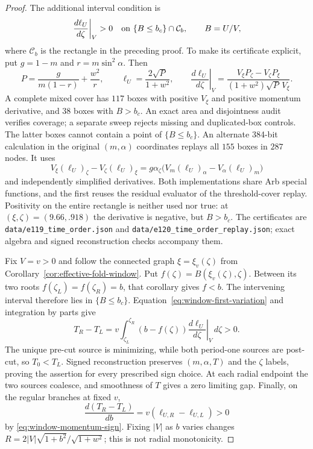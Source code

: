 \documentclass[11pt,a4paper]{article}
\theoremstyle{remark}\newtheorem{remark}[theorem]{Remark}
\begin{document}
\begin{proof}
The additional interval condition is
\begin{equation}\label{eq:window-momentum-sign}
 \left.\frac{d\ell_U}{d\zeta}\right|_V>0
 \quad\hbox{on }\{B\le b_c\}\cap\mathcal C_b,
 \qquad B=U/V,
\end{equation}
where $\mathcal C_b$ is the rectangle in the preceding proof. To make
its certificate explicit, put $g=1-m$ and $r=m\sin^2\alpha$. Then
\[
 P=\frac{g}{m(1-r)}+\frac{w^2}{r},\qquad
 \ell_U=\frac{2\sqrt P}{1+w^2},\qquad
 \left.\frac{d\ell_U}{d\zeta}\right|_V
 =\frac{V_\xi P_\zeta-V_\zeta P_\xi}
 {(1+w^2)\sqrt P\,V_\xi}.
\]
A complete mixed cover has $117$ boxes with positive $V_\xi$ and
positive momentum derivative, and $38$ boxes with $B>b_c$.
An exact area and disjointness audit verifies coverage; a separate
sweep rejects missing and duplicated-box controls. The latter boxes
cannot contain a point of $\{B\le b_c\}$.
An alternate 384-bit calculation in the original $(m,\alpha)$ coordinates
replays all $155$ boxes in $287$ nodes. It uses
\[
 V_\xi(\ell_U)_\zeta-V_\zeta(\ell_U)_\xi
 =g\alpha_\zeta\bigl(V_m(\ell_U)_\alpha-V_\alpha(\ell_U)_m\bigr)
\]
and independently simplified derivatives.  Both implementations share
Arb special functions, and the first reuses the residual evaluator of
the threshold-cover replay. Positivity on the entire rectangle is neither
used nor true: at $(\xi,\zeta)=(9.66,.918)$ the derivative is negative,
but $B>b_c$. The certificates are
\nolinkurl{data/e119_time_order.json} and
\nolinkurl{data/e120_time_order_replay.json}; exact algebra and signed
reconstruction checks accompany them.

Fix $V=v>0$ and follow the connected graph $\xi=\xi_v(\zeta)$
from Corollary~\ref{cor:effective-fold-window}. Put
$f(\zeta)=B(\xi_v(\zeta),\zeta)$.
Between its two roots $f(\zeta_L)=f(\zeta_R)=b$, that corollary gives
$f<b$. The intervening interval therefore lies in $\{B\le b_c\}$.
Equation~\eqref{eq:window-first-variation} and integration by parts give
\begin{equation}\label{eq:window-time-gap-integral}
 T_R-T_L
 =v\int_{\zeta_L}^{\zeta_R}(b-f(\zeta))
       \left.\frac{d\ell_U}{d\zeta}\right|_V\,d\zeta>0.
\end{equation}
The unique pre-cut source is minimizing, while both period-one sources
are post-cut, so $T_0<T_L$. Signed reconstruction preserves
$(m,\alpha,T)$ and the $\zeta$ labels, proving the assertion for every
prescribed sign choice. At each radial endpoint the two sources
coalesce, and smoothness of $T$ gives a zero limiting gap.
Finally, on the regular branches at fixed $v$,
\[
 \frac{d(T_R-T_L)}{db}=v(\ell_{U,R}-\ell_{U,L})>0
\]
by \eqref{eq:window-momentum-sign}. Fixing $|V|$ as $b$ varies changes
$R=2|V|\sqrt{1+b^2}/\sqrt{1+w^2}$; this is not radial monotonicity.
\end{proof}
\end{document}
